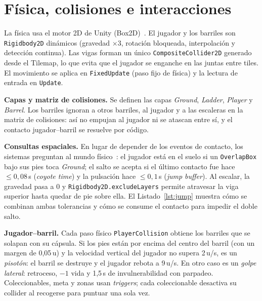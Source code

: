 \documentclass[runningheads]{llncs}
\begin{document}
\section{Física, colisiones e interacciones}
La física usa el motor 2D de Unity (Box2D)~\cite{unity}. El jugador y los barriles son
\texttt{Rigidbody2D} dinámicos (gravedad $\times3$, rotación bloqueada, interpolación y detección
continua). Las vigas forman un único \texttt{CompositeCollider2D} generado desde el Tilemap, lo que
evita que el jugador se enganche en las juntas entre tiles. El movimiento se aplica en
\texttt{FixedUpdate} (paso fijo de física) y la lectura de entrada en \texttt{Update}.

\textbf{Capas y matriz de colisiones.} Se definen las capas \emph{Ground}, \emph{Ladder},
\emph{Player} y \emph{Barrel}. Los barriles ignoran a otros barriles, al jugador y a las escaleras en
la matriz de colisiones: así no empujan al jugador ni se atascan entre sí, y el contacto
jugador--barril se resuelve por código.

\textbf{Consultas espaciales.} En lugar de depender de los eventos de contacto, los sistemas preguntan
al mundo físico~\cite{ericson}: el jugador está en el suelo si un \texttt{OverlapBox} bajo sus pies toca
\emph{Ground}; el salto se acepta si el último contacto fue hace $\le0{,}08$\,s (\emph{coyote time}) y
la pulsación hace $\le0{,}1$\,s (\emph{jump buffer}). Al escalar, la gravedad pasa a 0 y
\texttt{Rigidbody2D.excludeLayers} permite atravesar la viga superior hasta quedar de pie sobre ella.
El Listado~\ref{lst:jump} muestra cómo se combinan ambas tolerancias y cómo se consume el contacto
para impedir el doble salto.

\textbf{Jugador--barril.} Cada paso físico \texttt{PlayerCollision} obtiene los barriles que se solapan
con su cápsula. Si los pies están por encima del centro del barril (con un margen de 0,05\,u) y la
velocidad vertical del jugador no supera 2\,u/s, es un
\emph{pisotón}: el barril se destruye y el jugador rebota a 9\,u/s. En otro caso es un \emph{golpe
lateral}: retroceso, $-1$ vida y 1,5\,s de invulnerabilidad con parpadeo. Coleccionables, meta y
zonas usan \emph{triggers}; cada coleccionable desactiva su collider al recogerse para puntuar una
sola vez.
\end{document}

